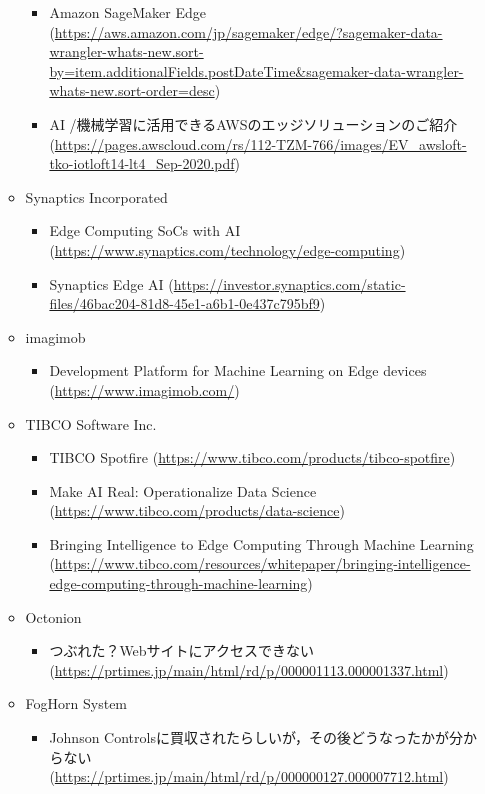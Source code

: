 \begin{itemize}
\begin{itemize}
		\begin{itemize}
			\item Amazon SageMaker Edge (\url{https://aws.amazon.com/jp/sagemaker/edge/?sagemaker-data-wrangler-whats-new.sort-by=item.additionalFields.postDateTime&sagemaker-data-wrangler-whats-new.sort-order=desc})
			\item AI /機械学習に活用できるAWSのエッジソリューションのご紹介 (\url{https://pages.awscloud.com/rs/112-TZM-766/images/EV_awsloft-tko-iotloft14-lt4_Sep-2020.pdf})
		\end{itemize}
		\item Synaptics Incorporated
		\begin{itemize}
			\item Edge Computing SoCs with AI (\url{https://www.synaptics.com/technology/edge-computing})
			\item Synaptics Edge AI (\url{https://investor.synaptics.com/static-files/46bac204-81d8-45e1-a6b1-0e437c795bf9})
		\end{itemize}
		\item imagimob
		\begin{itemize}
			\item Development Platform for Machine Learning on Edge devices (\url{https://www.imagimob.com/})
		\end{itemize}
		\item TIBCO Software Inc.
		\begin{itemize}
			\item TIBCO Spotfire (\url{https://www.tibco.com/products/tibco-spotfire})
			\item Make AI Real: Operationalize Data Science (\url{https://www.tibco.com/products/data-science})
			\item Bringing Intelligence to Edge Computing Through Machine Learning (\url{https://www.tibco.com/resources/whitepaper/bringing-intelligence-edge-computing-through-machine-learning})
		\end{itemize}
		\item Octonion
		\begin{itemize}
			\item つぶれた？Webサイトにアクセスできない (\url{https://prtimes.jp/main/html/rd/p/000001113.000001337.html})
		\end{itemize}
		\item FogHorn System
		\begin{itemize}
			\item Johnson Controlsに買収されたらしいが，その後どうなったかが分からない (\url{https://prtimes.jp/main/html/rd/p/000000127.000007712.html})

\end{itemize}
\end{itemize}
\end{itemize}
